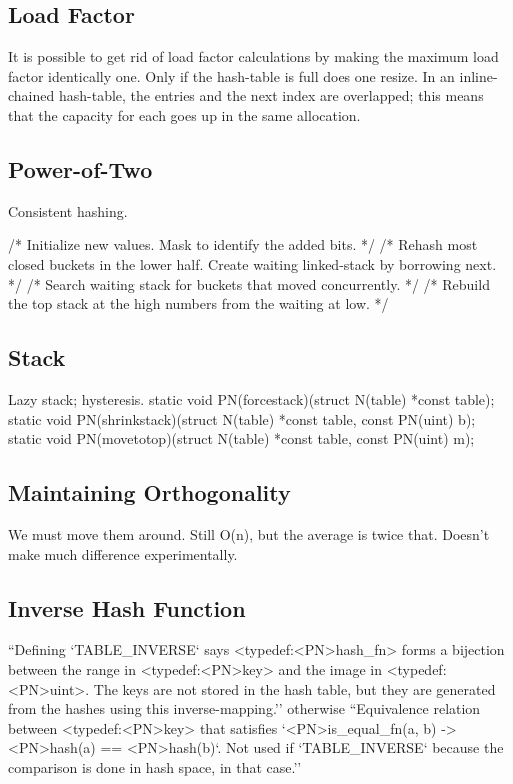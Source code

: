 \documentclass[12pt]{article}
\begin{document}
\subsection{Load Factor}

It is possible to get rid of load factor calculations by making the maximum load factor identically one. Only if the hash-table is full does one resize. In an inline-chained hash-table, the entries and the next index are overlapped; this means that the capacity for each goes up in the same allocation.

\subsection{Power-of-Two}

Consistent hashing.\cite{karger1997consistent}

/* Initialize new values. Mask to identify the added bits. */
	/* Rehash most closed buckets in the lower half. Create waiting
	 linked-stack by borrowing next. */
	/* Search waiting stack for buckets that moved concurrently. */
	/* Rebuild the top stack at the high numbers from the waiting at low. */

\subsection{Stack}

Lazy stack; hysteresis.
static void PN(forcestack)(struct N(table) *const table);
static void PN(shrinkstack)(struct N(table) *const table,
	const PN(uint) b);
static void PN(movetotop)(struct N(table) *const table, const PN(uint) m);

\subsection{Maintaining Orthogonality}

We must move them around. Still O(n), but the average is twice that. Doesn't make much difference experimentally.

\subsection{Inverse Hash Function}

``Defining `TABLE\_INVERSE` says <typedef:<PN>hash\_fn> forms a bijection
 between the range in <typedef:<PN>key> and the image in <typedef:<PN>uint>.
 The keys are not stored in the hash table, but they are generated from the
 hashes using this inverse-mapping.'' otherwise ``Equivalence relation between <typedef:<PN>key> that satisfies
 `<PN>is\_equal\_fn(a, b) -> <PN>hash(a) == <PN>hash(b)`. Not used if
 `TABLE\_INVERSE` because the comparison is done in hash space, in that case.''
\end{document}
